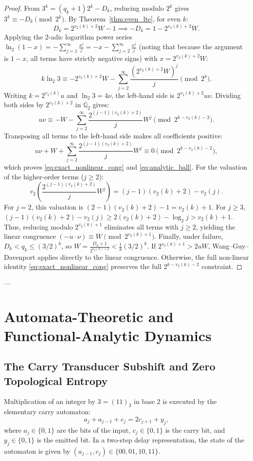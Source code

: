 \documentclass[11pt,reqno]{amsart}
\theoremstyle{definition}
\numberwithin{equation}{section}
\begin{document}
\begin{proof}
From $3^k = (q_k + 1)2^k - D_k$, reducing modulo $2^k$ gives $3^k \equiv -D_k \pmod{2^k}$.
By Theorem~\ref{thm:even_lte}, for even $k$:
\[
D_k = 2^{v_2(k)+2} W - 1 \implies -D_k = 1 - 2^{v_2(k)+2} W.
\]
Applying the 2-adic logarithm power series $\ln_2(1 - x) = -\sum_{j=1}^\infty \frac{x^j}{j} = -x - \sum_{j=2}^\infty \frac{x^j}{j}$ (noting that because the argument is $1 - x$, all terms have strictly negative signs) with $x = 2^{v_2(k)+2} W$:
\[
k \ln_2 3 \equiv -2^{v_2(k)+2} W - \sum_{j=2}^\infty \frac{(2^{v_2(k)+2} W)^j}{j} \pmod{2^k}.
\]
Writing $k = 2^{v_2(k)} u$ and $\ln_2 3 = 4 \nu$, the left-hand side is $2^{v_2(k)+2} u \nu$. Dividing both sides by $2^{v_2(k)+2}$ in $\mathbb{Q}_2$ gives:
\[
u \nu \equiv -W - \sum_{j=2}^\infty \frac{2^{(j-1)(v_2(k)+2)}}{j} W^j \pmod{2^{k - v_2(k) - 2}}.
\]
Transposing all terms to the left-hand side makes all coefficients positive:
\[
u \nu + W + \sum_{j=2}^\infty \frac{2^{(j-1)(v_2(k)+2)}}{j} W^j \equiv 0 \pmod{2^{k - v_2(k) - 2}},
\]
which proves \eqref{eq:exact_nonlinear_cong} and \eqref{eq:analytic_ball}.
For the valuation of the higher-order terms ($j \ge 2$):
\[
v_2\left( \frac{2^{(j-1)(v_2(k)+2)}}{j} W^j \right) = (j-1)(v_2(k)+2) - v_2(j).
\]
For $j = 2$, this valuation is $(2-1)(v_2(k)+2) - 1 = v_2(k) + 1$.
For $j \ge 3$, $(j-1)(v_2(k)+2) - v_2(j) \ge 2(v_2(k)+2) - \log_2 j > v_2(k)+1$.
Thus, reducing modulo $2^{v_2(k)+1}$ eliminates all terms with $j \ge 2$, yielding the linear congruence $(-u \cdot \nu) \equiv W \pmod{2^{v_2(k)+1}}$.
Finally, under failure, $D_k < q_k \le (3/2)^k$, so $W = \frac{D_k + 1}{2^{v_2(k)+2}} < \frac{1}{8}(3/2)^k$. If $2^{v_2(k)+1} > 2 u W$, Wang--Guy--Davenport applies directly to the linear congruence. Otherwise, the full non-linear identity \eqref{eq:exact_nonlinear_cong} preserves the full $2^{k - v_2(k) - 2}$ constraint.
\end{proof}

---

\section{Automata-Theoretic and Functional-Analytic Dynamics}

\subsection{The Carry Transducer Subshift and Zero Topological Entropy}
Multiplication of an integer by $3 = (11)_2$ in base $2$ is executed by the elementary carry automaton:
\[
a_j + a_{j-1} + c_j = 2 c_{j+1} + y_j,
\]
where $a_j \in \{0, 1\}$ are the bits of the input, $c_j \in \{0, 1\}$ is the carry bit, and $y_j \in \{0, 1\}$ is the emitted bit.
In a two-step delay representation, the state of the automaton is given by $(a_{j-1}, c_j) \in \{00, 01, 10, 11\}$.
\end{document}
